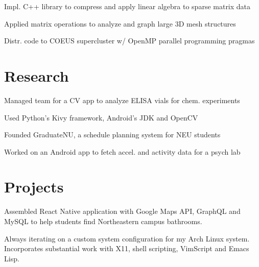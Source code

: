 \documentclass[letterpaper]{deedy-resume} %
\begin{document}
\begin{minipage}[t]{0.66\textwidth}
\begin{tightitemize}
  \item Impl. C++ library to compress and apply linear algebra to sparse matrix data
  \item Applied matrix operations to analyze and graph large 3D mesh structures
  \item Distr. code to COEUS supercluster w/ OpenMP parallel programming pragmas
\end{tightitemize}


\section{Research}


\begin{tightitemize}
  \item Managed team for a CV app to analyze ELISA vials for chem. experiments
  \item Used Python's Kivy framework, Android's JDK and OpenCV
  \item Founded GraduateNU, a schedule planning system for NEU students
  \item Worked on an Android app to fetch accel. and activity data for a psych lab
\end{tightitemize}


\section{Projects}
Assembled React Native application with Google Maps API,
GraphQL and MySQL to help students find Northeastern campus bathrooms.
\sectionspace

Always iterating on a custom system configuration for my Arch Linux system. \\
Incorporates substantial work with X11, shell scripting, VimScript and Emacs Lisp.
\sectionspace


\end{minipage}
\end{document}
